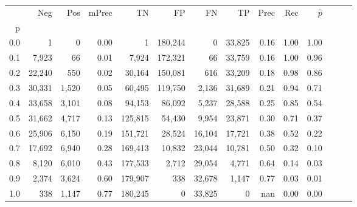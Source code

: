 \begin{tabular}{rrrrrrrrrrrrrr}
\toprule
{} &     Neg &    Pos & mPrec &       TN &       FP &      FN &      TP &  Prec &   Rec & $\hat{p}$ \\
p   &         &        &       &          &          &         &         &       &       &           \\
\midrule
0.0 &       1 &      0 &  0.00 &        1 &  180,244 &       0 &  33,825 &  0.16 &  1.00 &      1.00 \\
0.1 &   7,923 &     66 &  0.01 &    7,924 &  172,321 &      66 &  33,759 &  0.16 &  1.00 &      0.96 \\
0.2 &  22,240 &    550 &  0.02 &   30,164 &  150,081 &     616 &  33,209 &  0.18 &  0.98 &      0.86 \\
0.3 &  30,331 &  1,520 &  0.05 &   60,495 &  119,750 &   2,136 &  31,689 &  0.21 &  0.94 &      0.71 \\
0.4 &  33,658 &  3,101 &  0.08 &   94,153 &   86,092 &   5,237 &  28,588 &  0.25 &  0.85 &      0.54 \\
0.5 &  31,662 &  4,717 &  0.13 &  125,815 &   54,430 &   9,954 &  23,871 &  0.30 &  0.71 &      0.37 \\
0.6 &  25,906 &  6,150 &  0.19 &  151,721 &   28,524 &  16,104 &  17,721 &  0.38 &  0.52 &      0.22 \\
0.7 &  17,692 &  6,940 &  0.28 &  169,413 &   10,832 &  23,044 &  10,781 &  0.50 &  0.32 &      0.10 \\
0.8 &   8,120 &  6,010 &  0.43 &  177,533 &    2,712 &  29,054 &   4,771 &  0.64 &  0.14 &      0.03 \\
0.9 &   2,374 &  3,624 &  0.60 &  179,907 &      338 &  32,678 &   1,147 &  0.77 &  0.03 &      0.01 \\
1.0 &     338 &  1,147 &  0.77 &  180,245 &        0 &  33,825 &       0 &   nan &  0.00 &      0.00 \\
\bottomrule
\end{tabular}
